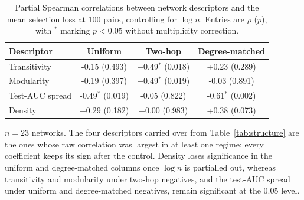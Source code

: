 \begin{table}[htbp]
\centering
\footnotesize
\caption{Partial Spearman correlations between network descriptors and the mean selection
loss at 100 pairs, controlling for $\log n$. Entries are $\rho$ ($p$), with
$^{*}$ marking $p<0.05$ without multiplicity correction.}
\label{tab:partial}
\begin{tabular}{lccc}
\toprule
Descriptor & Uniform & Two-hop & Degree-matched \\
\midrule
Transitivity & -0.15 (0.493) & +0.49$^{*}$ (0.018) & +0.23 (0.289) \\
Modularity & -0.19 (0.397) & +0.49$^{*}$ (0.019) & -0.03 (0.891) \\
Test-AUC spread & -0.49$^{*}$ (0.019) & -0.05 (0.822) & -0.61$^{*}$ (0.002) \\
Density & +0.29 (0.182) & +0.00 (0.983) & +0.38 (0.073) \\
\bottomrule
\end{tabular}
\par\vspace{2pt}\begin{minipage}{\linewidth}\footnotesize $n=23$ networks. The four
descriptors carried over from Table~\ref{tab:structure} are the ones whose raw
correlation was largest in at least one regime; every coefficient keeps its sign after
the control. Density loses significance in the uniform and degree-matched columns once
$\log n$ is partialled out, whereas transitivity and modularity under two-hop negatives,
and the test-AUC spread under uniform and degree-matched negatives, remain significant at
the 0.05 level.\end{minipage}
\end{table}
